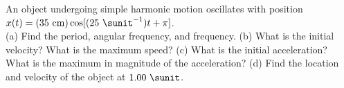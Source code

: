 An object undergoing simple harmonic motion oscillates with position $x(t) = (35\
\text{cm}) \cos[(25\ \sunit^{-1})t+\pi]$.\\
%
(a) Find the period, angular frequency, and frequency.\answercheck\hwendpart
%
(b) What is the initial velocity? What is the maximum
speed?\answercheck\hwendpart
%
(c) What is the initial acceleration? What is the
maximum in magnitude of the acceleration?\answercheck\hwendpart
%
(d) Find the location and velocity of the object at $1.00\ \sunit$.\answercheck
